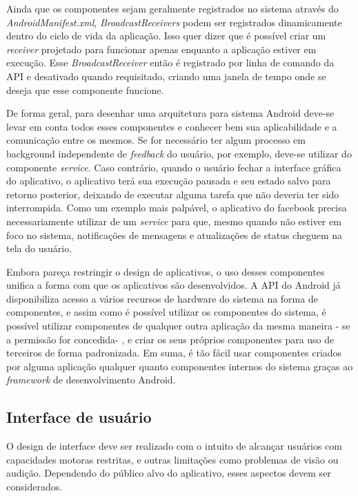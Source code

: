 Ainda que os componentes sejam geralmente registrados no sistema através do \textit{AndroidManifest.xml}, \textit{BroadcastReceivers} podem ser registrados dinamicamente dentro do ciclo de vida da aplicação. Isso quer dizer que é possível criar um \textit{receiver} projetado para funcionar apenas enquanto a aplicação estiver em execução. Esse \textit{BroadcastReceiver} então é registrado por linha de comando da API e desativado quando requisitado, criando uma janela de tempo onde se deseja que esse componente funcione.

De forma geral, para desenhar uma arquitetura para sistema Android deve-se levar em conta todos esses componentes e conhecer bem sua aplicabilidade e a comunicação entre os mesmos. Se for necessário ter algum processo em background independente de \textit{feedback} do usuário, por exemplo, deve-se utilizar do componente \textit{service}. Caso contrário, quando o usuário fechar a interface gráfica do aplicativo, o aplicativo terá sua execução pausada e seu estado salvo para retorno posterior, deixando de executar alguma tarefa que não deveria ter sido interrompida. Como um exemplo mais palpável, o aplicativo do facebook precisa necessariamente utilizar de um \textit{service} para que, mesmo quando não estiver em foco no sistema, notificações de mensagens e atualizações de status cheguem na tela do usuário.

Embora pareça restringir o design de aplicativos, o uso desses componentes unifica a forma com que os aplicativos são desenvolvidos. A API do Android já disponibiliza acesso a vários recursos de hardware do sistema na forma de componentes, e assim como é possível utilizar os componentes do sistema, é possível utilizar componentes de qualquer outra aplicação da mesma maneira - se a permissão for concedida- , e criar os seus próprios componentes para uso de terceiros de forma padronizada. Em suma, é tão fácil usar componentes criados por alguma aplicação qualquer quanto componentes internos do sistema graças ao \textit{framework} de desenvolvimento Android.

\subsection{Interface de usuário}

O design de interface deve ser realizado com o intuito de alcançar usuários com capacidades motoras restritas, e outras limitações como problemas de visão ou audição. Dependendo do público alvo do aplicativo, esses aspectos devem ser considerados.

